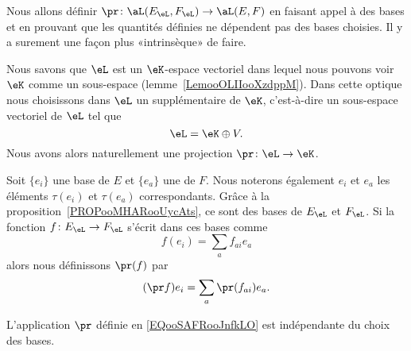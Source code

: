 \begin{probleme}
	Nous allons définir \( \pr\colon \aL(E_{\eL},F_{\eL})\to \aL(E,F)\) en faisant appel à des bases et en prouvant que les quantités définies ne dépendent pas des bases choisies. Il y a surement une façon plus «intrinsèque» de faire.
\end{probleme}


Nous savons que \( \eL\) est un \( \eK\)-espace vectoriel dans lequel nous pouvons voir \( \eK\) comme un sous-espace (lemme~\ref{LemooOLIIooXzdppM}). Dans cette optique nous choisissons dans \( \eL\) un supplémentaire de \( \eK\), c'est-à-dire un sous-espace vectoriel de \( \eL\) tel que
\begin{equation}
	\eL=\eK\oplus V.
\end{equation}
Nous avons alors naturellement une projection \( \pr\colon \eL\to \eK\).

Soit \( \{ e_i \}\) une base de \( E \) et \(\{ e_a \}\) une  de \( F\). Nous noterons également \( e_i\) et \( e_a\) les éléments \( \tau (e_i)\) et \( \tau (e_a)\) correspondants. Grâce à la proposition~\ref{PROPooMHARooUycAts}, ce sont des bases de \( E_{\eL}\) et \( F_{\eL}\). Si la fonction \( f\colon E_{\eL}\to F_{\eL}\) s'écrit dans ces bases comme
\begin{equation}
	f(e_i)=\sum_af_{ai}e_a
\end{equation}
alors nous définissons \( \pr(f)\) par
\begin{equation}        \label{EQooSAFRooJnfkLO}
	(\pr f)e_i=\sum_a\pr(f_{ai})e_a.
\end{equation}

\begin{proposition}      \label{PROPooOEHTooHyjuZQ}
	L'application \( \pr\) définie en \eqref{EQooSAFRooJnfkLO} est indépendante du choix des bases.
\end{proposition}

